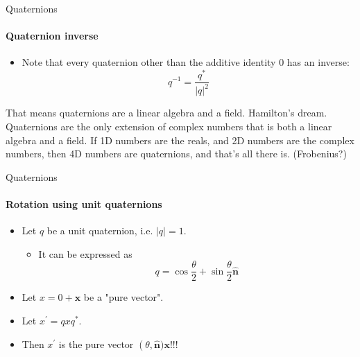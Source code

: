 \documentclass[aspectratio=169]{beamer}
\begin{document}
\begin{frame}{Quaternions}
    \framesubtitle{Quaternion inverse}
    \begin{itemize}
        \item[]Note that every quaternion other than the additive identity $0$ has an inverse:
              \[ q^{-1} = \frac{q^*}{|q|^2} \]
    \end{itemize}
    That means quaternions are a linear algebra and a field.  Hamilton's dream.  Quaternions are the only extension of  complex numbers that is both a linear algebra and a field.  If 1D numbers are the reals, and 2D numbers are the complex numbers, then 4D numbers are quaternions, and that's all there is.  (Frobenius?)
\end{frame}

\begin{frame}{Quaternions}
    \framesubtitle{Rotation using unit quaternions}

    \begin{itemize}
        \item Let $q$ be a unit quaternion, i.e. $|q|=1$.
              \begin{itemize}
                  \item  It can be expressed as
                        \begin{equation}
                            q = \cos \frac{\theta}{2} + \sin \frac{\theta}{2} \hat{\mathbf{n}}
                        \end{equation}
              \end{itemize}
        \item Let $x = 0 + \mathbf{x}$ be a "pure vector".
        \item Let $x^\prime = qxq^*$.
        \item Then $x^\prime$ is the pure vector $\operatorname(\theta,\hat{\mathbf{n}}) \mathbf{x}$!!!
    \end{itemize}
\end{frame}
\end{document}
